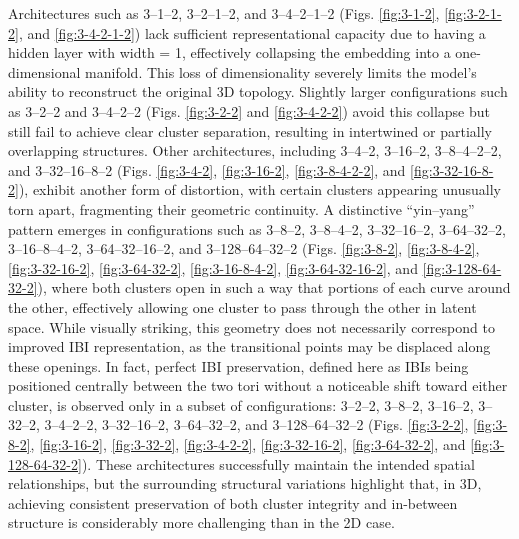 Architectures such as 3–1–2, 3–2–1–2, and 3–4–2–1–2 (Figs. \ref{fig:3-1-2}, \ref{fig:3-2-1-2}, and \ref{fig:3-4-2-1-2}) lack sufficient representational capacity due to having a hidden layer with width = 1, effectively collapsing the embedding into a one-dimensional manifold. This loss of dimensionality severely limits the model’s ability to reconstruct the original 3D topology. 
Slightly larger configurations such as 3–2–2 and 3–4–2–2 (Figs. \ref{fig:3-2-2} and \ref{fig:3-4-2-2}) avoid this collapse but still fail to achieve clear cluster separation, resulting in intertwined or partially overlapping structures.
Other architectures, including 3–4–2, 3–16–2, 3–8–4–2–2, and 3–32–16–8–2 (Figs. \ref{fig:3-4-2}, \ref{fig:3-16-2}, \ref{fig:3-8-4-2-2}, and \ref{fig:3-32-16-8-2}), exhibit another form of distortion, with certain clusters appearing unusually torn apart, fragmenting their geometric continuity. 
A distinctive “yin–yang” pattern emerges in configurations such as 3–8–2, 3–8–4–2, 3–32–16–2, 3–64–32–2, 3–16–8–4–2, 3–64–32–16–2, and 3–128–64–32–2 (Figs. \ref{fig:3-8-2}, \ref{fig:3-8-4-2}, \ref{fig:3-32-16-2}, \ref{fig:3-64-32-2}, \ref{fig:3-16-8-4-2}, \ref{fig:3-64-32-16-2}, and \ref{fig:3-128-64-32-2}), where both clusters open in such a way that portions of each curve around the other, effectively allowing one cluster to pass through the other in latent space. While visually striking, this geometry does not necessarily correspond to improved IBI representation, as the transitional points may be displaced along these openings. In fact, perfect IBI preservation, defined here as IBIs being positioned centrally between the two tori without a noticeable shift toward either cluster, is observed only in a subset of configurations: 3–2–2, 3–8–2, 3–16–2, 3–32–2, 3–4–2–2, 3–32–16–2, 3–64–32–2, and 3–128–64–32–2 (Figs. \ref{fig:3-2-2}, \ref{fig:3-8-2}, \ref{fig:3-16-2}, \ref{fig:3-32-2}, \ref{fig:3-4-2-2}, \ref{fig:3-32-16-2}, \ref{fig:3-64-32-2}, and \ref{fig:3-128-64-32-2}). These architectures successfully maintain the intended spatial relationships, but the surrounding structural variations highlight that, in 3D, achieving consistent preservation of both cluster integrity and in-between structure is considerably more challenging than in the 2D case.
\newline

